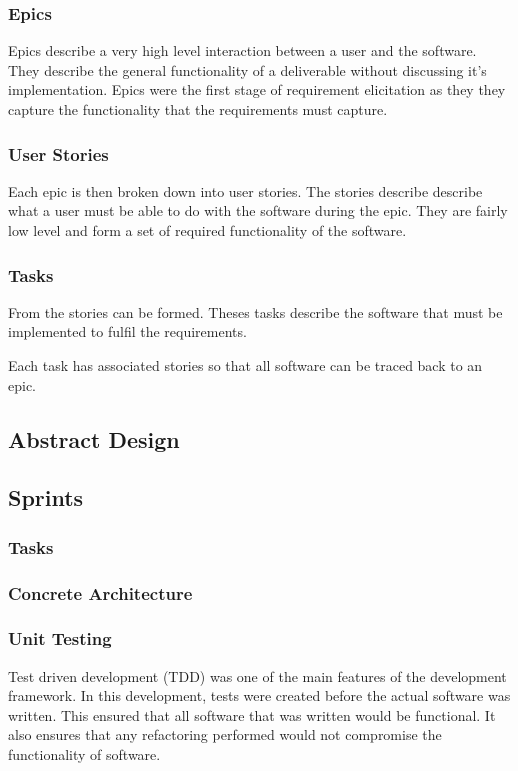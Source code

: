 \documentclass{article}
\begin{document}
\subsubsection{Epics}
Epics describe a very high level interaction between a user and the software. They describe the general functionality of a deliverable without discussing it's implementation. Epics were the first stage of requirement elicitation as they they capture the functionality that the requirements must capture.
\subsubsection{User Stories}
Each epic is then broken down into user stories. The stories describe describe what a user must be able to do with the software during the epic. They are fairly low level and form a set of required functionality of the software.

\subsubsection{Tasks}
From the stories can be formed. Theses tasks describe the software that must be implemented to fulfil the requirements. 

Each task has associated stories so that all software can be traced back to an epic.
\subsection{Abstract Design}

\subsection{Sprints}
\subsubsection{Tasks}
\subsubsection{Concrete Architecture}
\subsubsection{Unit Testing}
Test driven development (TDD) was one of the main features of the development framework. In this development, tests were created before the actual software was written. This ensured that all software that was written would be functional. It also ensures that any refactoring performed would not compromise the functionality of software.\\
\end{document}

